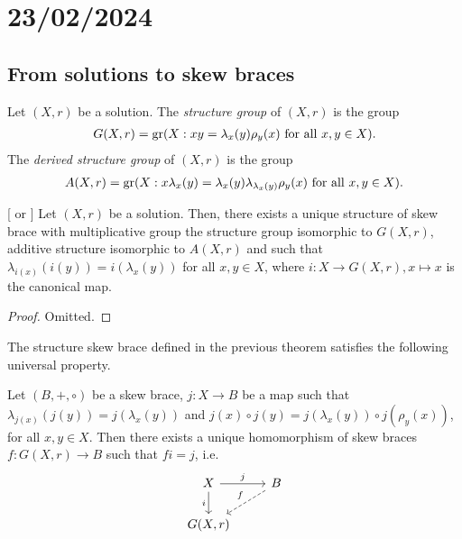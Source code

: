 \section{23/02/2024}

\subsection{From solutions to skew braces}

    \begin{definition}
        Let $(X,r)$ be a solution. The \emph{structure group} of $(X,r)$ is the group
        \begin{align*}
            G(X,r)=\operatorname{gr}(X : xy=\lambda_x(y)\rho_y(x) \text{ for all }x,y\in X).
        \end{align*}
        The \emph{derived structure group} of $(X,r)$ is the group
        \begin{align*} 
            A(X,r)=\operatorname{gr}(X : x\lambda_x(y)=\lambda_x(y)\lambda_{\lambda_x(y)}\rho_y(x) \text{ for all }x,y\in X).
        \end{align*}
    \end{definition}

        
    \begin{theorem}\label{thm:structuregroup}[\cite{MR1722951} or \cite{LYZ00}]
    Let $(X,r)$ be a solution.
    Then, there exists a unique structure of skew brace with multiplicative group the structure group isomorphic to $G(X,r)$, additive structure isomorphic to $A(X,r)$ and such that $\lambda_{i(x)}(i(y))=i(\lambda_x(y))$ for all $x,y\in X$, where $i: X\to G(X,r), x\mapsto x$ is the canonical map. 
    \end{theorem}

    \begin{proof}
        Omitted.
    \end{proof}

    The structure skew brace defined in the previous theorem satisfies the following universal property.
    
    \begin{proposition}
        Let $(B,+,\circ)$ be a skew brace, $j\colon X\rightarrow B$ be a map such that $\lambda_{j(x)}(j(y))=j(\lambda_x(y))$ and $j(x)\circ j(y)=j(\lambda_x(y))\circ j(\rho_y(x))$, for all $x,y\in X$. Then there exists a unique homomorphism of skew braces $f\colon G(X,r)\rightarrow B$ such that $fi=j$, i.e.
        \begin{equation*}
        \begin{tikzcd}
            X \arrow[r,"j"] \arrow[d,swap,"i"] &
            B \arrow[dl,swap, dashed,"f"] 
            \\
            G(X,r) 
        \end{tikzcd}
        \end{equation*}
    \end{proposition}

